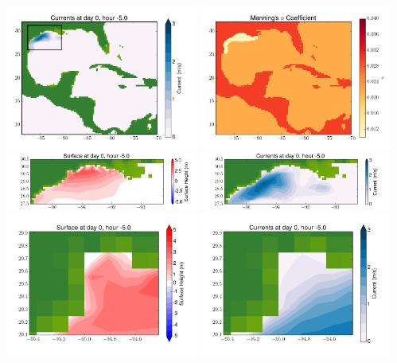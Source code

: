 \documentclass[11pt]{article}
\begin{document}
\includegraphics[width=0.475\textwidth]{frame0067fig2.png}
\vskip 10pt 
\includegraphics[width=0.475\textwidth]{frame0067fig3.png}
\includegraphics[width=0.475\textwidth]{frame0067fig4.png}
\vskip 10pt 
\includegraphics[width=0.475\textwidth]{frame0067fig5.png}
\includegraphics[width=0.475\textwidth]{frame0067fig6.png}
\vskip 10pt 
\includegraphics[width=0.475\textwidth]{frame0067fig7.png}
\end{document}
